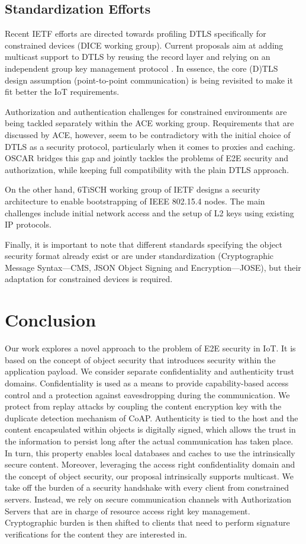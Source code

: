 \documentclass[conference]{IEEEtran}
\begin{document}
\subsection{Standardization Efforts}
Recent IETF efforts are directed towards profiling DTLS specifically for
constrained devices (DICE working group). Current proposals aim at adding
multicast support to DTLS by reusing the record layer and relying on an
independent group key management protocol \cite{dtls-multicast-draft}. In
essence, the core (D)TLS design assumption (point-to-point communication) is
being revisited to make it fit better the IoT requirements.

Authorization and authentication challenges for constrained environments are being tackled
separately within the ACE working group. Requirements that are discussed by ACE,
however, seem to be contradictory with the initial choice of DTLS as a security protocol,
 particularly when it comes to proxies and caching. OSCAR bridges this gap and
 jointly tackles the problems
 of E2E security and authorization, while keeping full compatibility with the plain DTLS approach. 

On the other hand, 6TiSCH working group of IETF designs a security architecture
to enable bootstrapping of IEEE 802.15.4 nodes. The main challenges include initial network access 
and the setup of L2 keys using existing IP protocols.

Finally, it is important to note that different standards specifying the object security format already exist or 
are under standardization (Cryptographic Message Syntax---CMS, JSON Object Signing and 
Encryption---JOSE), but their adaptation for constrained devices is required. 


\section{Conclusion}
\label{conclusion}
Our work explores a novel approach to the problem of E2E security in IoT. It is
based on the concept of object security that introduces security
within the application payload. We consider separate confidentiality and
authenticity trust domains. Confidentiality is used as a means to provide
capability-based access control and a protection against eavesdropping during
the communication. We protect from replay attacks by coupling the content
encryption key with the duplicate detection mechanism of CoAP. 
Authenticity is tied to the host and the content encapsulated within
objects is digitally signed, which allows the trust in the information to
persist long after the actual communication has taken place. In turn, this
property enables local databases and caches to use the intrinsically secure
content. Moreover, leveraging the access right confidentiality domain and the
concept of object security, our proposal intrinsically supports multicast. We
take off the burden of a security handshake with every client from constrained
servers. Instead, we rely on secure communication channels with Authorization
Servers that are in charge of resource access right key
management. Cryptographic burden is then shifted to clients that need to perform
signature verifications for the content they are interested in.
\end{document}
